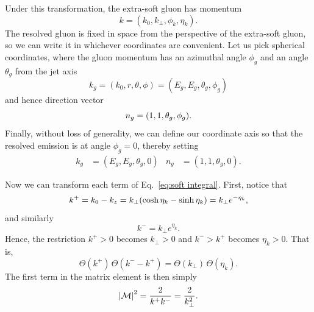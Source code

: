 \documentclass[11pt,twoside,reqno]{amsart}
\theoremstyle{plain}
\theoremstyle{remark}
\theoremstyle{definition}
\theoremstyle{remark}
\theoremstyle{definition}
\theoremstyle{definition}
\newcommand{\cM}{\mathcal{M}}
\begin{document}
	Under this transformation, the extra-soft gluon has momentum
	\begin{equation}
		k = (k_0, k_\perp, \phi_k, \eta_k).
	\end{equation}
	The resolved gluon is fixed in space from the perspective of the extra-soft gluon, so we can write it in whichever coordinates are convenient. Let us pick spherical coordinates, where the gluon momentum has an azimuthal angle $\phi_g$ and an angle $\theta_g$ from the jet axis
	\begin{equation}
		k_g = (k_0, r, \theta, \phi) = (E_g, E_g, \theta_g, \phi_g)
	\end{equation}
	and hence direction vector
	\begin{equation}
		n_g = \qty(1, 1, \theta_g, \phi_g).
	\end{equation}
	Finally, without loss of generality, we can define our coordinate axis so that the resolved emission is at angle $\phi_g = 0$, thereby setting
	\begin{equation}
	\begin{aligned}
		k_g &= (E_g, E_g, \theta_g, 0) & n_g &= (1, 1, \theta_g, 0).
	\end{aligned}
	\end{equation}

	Now we can transform each term of Eq.~\ref{eq:soft integral}. First, notice that
	\begin{equation}
		k^+ = k_0 - k_z = k_\perp \qty(\cosh\eta_k - \sinh\eta_k) = k_\perp e^{-\eta_k},
	\end{equation}
	and similarly
	\begin{equation}
		k^- = k_\perp e^{\eta_k}.
	\end{equation}
	Hence, the restriction $k^+ > 0$ becomes $k_\perp > 0$ and $k^- > k^+$ becomes $\eta_k > 0$. That is,
	\begin{equation}
		\Theta(k^+)\,\Theta(k^- - k^+) = \Theta(k_\perp)\,\Theta(\eta_k).
	\end{equation}
	The first term in the matrix element is then simply
	\begin{equation}
		\abs{\cM}^2 = \frac{2}{k^+ k^-} = \frac{2}{k_\perp^2}.
	\end{equation}
\end{document}
